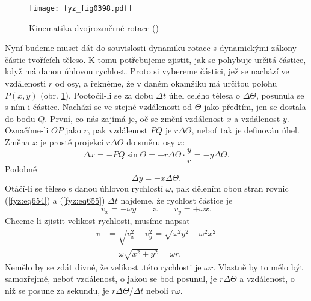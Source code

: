     \begin{figure}[ht!] %
      \centering
      \texttt{[image: fyz\_fig0398.pdf]}
      \caption{Kinematika dvojrozměrné rotace (\cite[s.~251]{Feynman01})}
      \label{fyz:fig0398}
    \end{figure}
    
    Nyní budeme muset dát do souvislosti dynamiku rotace s dynamickými zákony částic tvořících
    těleso. K tomu potřebujeme zjistit, jak se pohybuje určitá částice, když má danou úhlovou
    rychlost. Proto si vybereme částici, jež se nachází ve vzdálenosti \(r\) od osy, a řekněme, že v
    daném okamžiku má určitou polohu \(P( x, y)\) (obr. \ref{fyz:fig0398}). Pootočil-li se za dobu
    \(\Delta t\)  úhel celého tělesa o \(\Delta\varTheta\), posunula se s ním i částice. Nachází se
    ve stejné vzdálenosti od \(\varTheta\) jako předtím, jen se dostala do bodu \(Q\). První, co nás
    zajímá je, oč se změní vzdálenost \(x\) a vzdálenost \(y\). Označíme-li \(OP\) jako \(r\), pak
    vzdálenost \(PQ\) je \(r\Delta\varTheta\), neboť tak je deﬁnován úhel. Změna \(x\) je prostě
    projekcí \(r\Delta\varTheta\) do směru osy \(x\):
    \begin{equation}\label{fyz:eq654}
      Δx=−PQ\sin\varTheta =−rΔ\varTheta\cdot\frac{y}{r}=−yΔ\varTheta.
    \end{equation}
    Podobně
    \begin{equation}\label{fyz:eq655}
      Δy=−x\Delta\varTheta.
    \end{equation}
    Otáčí-li se těleso s danou úhlovou rychlostí \(\omega\), pak dělením obou stran rovnic
    (\ref{fyz:eq654}) a (\ref{fyz:eq655}) \(\Delta t\) najdeme, že rychlost částice je
    \begin{equation}\label{fyz:eq656}
      v_x=−ωy \qquad\text{a}\qquad v_y=+ωx.
    \end{equation}
    Chceme-li zjistit velikost rychlosti, musíme napsat
    \begin{align}
      v&=\sqrt{v^2_x+v^2_y}=\sqrt{ω^2y^2+ω^2x^2} \nonumber\\
       &=ω\sqrt{x^2+y^2}=ωr.                     \label{fyz:eq657}
    \end{align}
    Nemělo by se zdát divné, že velikost .této rychlosti je \(\omega r\). Vlastně by to mělo být
    samozřejmé, neboť vzdálenost, o jakou se bod posunul, je  \(rΔ\varTheta\) a vzdálenost, o niž se
    posune za sekundu, je \(rΔ\varTheta/Δt\) neboli \(r\omega\).

